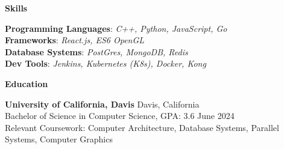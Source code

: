 \documentclass[11pt]{article}
\begin{document}

\begin{center}
    \textbf{Skills}
\end{center}

\textbf{Programming Languages}: \textit{C++, Python, JavaScript, Go}\\
\textbf{Frameworks}: \textit{React.js, ES6 OpenGL}\\
\textbf{Database Systems}: \textit{PostGres, MongoDB, Redis}\\
\textbf{Dev Tools}: \textit{Jenkins, Kubernetes (K8s), Docker, Kong}


\begin{center}
    \textbf{Education}
\end{center}
\textbf{University of California, Davis} \hfill Davis, California\\
Bachelor of Science in Computer Science, GPA: 3.6 \hfill June 2024\\
Relevant Coursework: Computer Architecture, Database Systems, Parallel Systems, Computer Graphics
\vspace{8pt}
\end{document}
